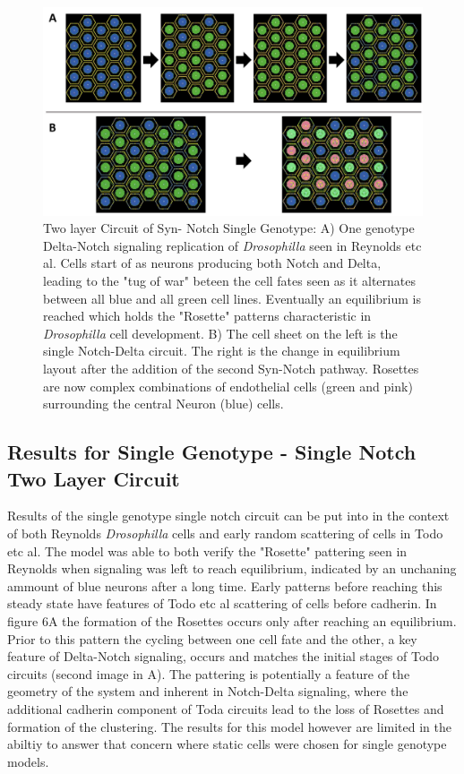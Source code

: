 \documentclass[12pt]{ifacconf}
\begin{document}
\begin{figure}
\begin{center}
\includegraphics[width=\textwidth]{One_Genotype_two_and_one_SynNotch}    %
\caption{Two layer Circuit of Syn- Notch Single Genotype: A) One genotype Delta-Notch signaling replication of \emph{Drosophilla} seen in Reynolds etc al. Cells start of as neurons producing both Notch and Delta, leading to the "tug of war" beteen the cell fates seen as it alternates between all blue and all green cell lines. Eventually an equilibrium is reached which holds the "Rosette" patterns characteristic in \emph{Drosophilla} cell development.  B) The cell sheet on the left is the single Notch-Delta circuit. The right is the change in equilibrium layout after the addition of the second Syn-Notch pathway. Rosettes are now complex combinations of endothelial cells (green and pink) surrounding the central Neuron (blue) cells. } 
\label{fig:bifurcation}
\end{center}
\end{figure}

\subsection{Results for Single Genotype - Single Notch Two Layer Circuit} 

Results of the single genotype single notch circuit can be put into in the context of both Reynolds \emph{Drosophilla} cells and early random scattering of cells in Todo etc al. The model was able to both verify the "Rosette" pattering seen in Reynolds when signaling was left to reach equilibrium, indicated by an unchaning ammount of blue neurons after a long time. Early patterns before reaching this steady state have features of Todo etc al scattering of cells before cadherin. In figure 6A the formation of the Rosettes occurs only after reaching an equilibrium. Prior to this pattern the cycling between one cell fate and the other, a key feature of Delta-Notch signaling, occurs and matches the initial stages of Todo circuits (second image in A). The pattering is potentially a feature of the geometry of the system and inherent in Notch-Delta signaling, where the additional cadherin component of Toda circuits lead to the loss of Rosettes and formation of the clustering. The results for this model however are limited in the abiltiy to answer that concern where static cells were chosen for single genotype models.
\end{document}
